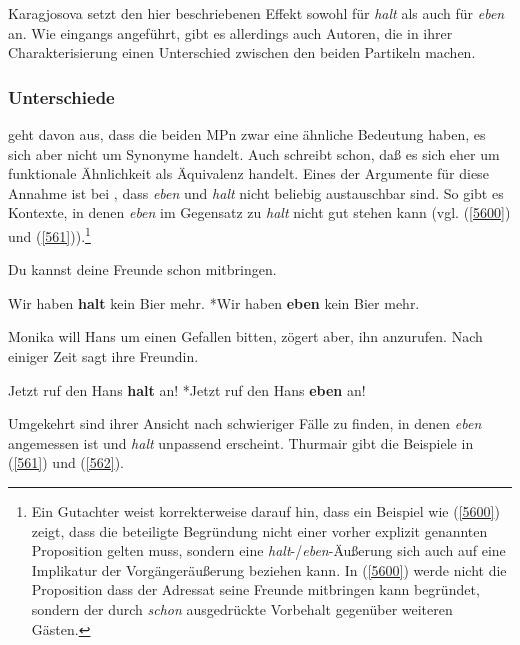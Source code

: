 Karagjosova setzt den hier beschriebenen Effekt sowohl für \textit{halt} als auch für \textit{eben} an. Wie eingangs angeführt, gibt es allerdings auch Autoren, die in ihrer Charakterisierung einen Unterschied zwischen den beiden Partikeln machen.

\subsubsection{Unterschiede}
\label{sec:untersch}
\citet[124]{Thurmair1989} geht davon aus, dass die beiden MPn zwar eine ähnliche Bedeutung haben, es sich aber nicht um Synonyme handelt. Auch \citet[254]{Dahl1988} schreibt schon, \glqq daß es sich eher um funktionale Ähnlichkeit als Äquivalenz\grqq{}  handelt. Eines der Argumente für diese Annahme ist bei \citet{Thurmair1989}, dass \textit{eben} und \textit{halt} nicht beliebig austauschbar sind. So gibt es Kontexte, in denen \textit{eben} im Gegensatz zu \textit{halt} nicht gut stehen kann (vgl. (\ref{5600}) und (\ref{561})).\footnote{Ein Gutachter weist korrekterweise darauf hin, dass ein Beispiel wie (\ref{5600}) zeigt, dass die beteiligte Begründung nicht einer vorher explizit genannten Proposition gelten muss, sondern eine \textit{halt}-/\textit{eben}-Äußerung sich auch auf eine Implikatur der Vorgängeräußerung beziehen kann. In (\ref{5600}) werde nicht die Proposition dass der Adressat seine Freunde mitbringen kann begründet, sondern der durch \textit{schon} ausgedrückte Vorbehalt gegenüber weiteren Gästen.}

\begin{exe}
	\ex\label{5600} Du kannst deine Freunde schon mitbringen.
		\begin{xlist}	
			\ex\label{560a} Wir haben \textbf{halt} kein Bier mehr.
			\ex\label{560b} *Wir haben \textbf{eben} kein Bier mehr.
		\end{xlist}
\end{exe}

\begin{exe}
	\ex\label{560} Monika will Hans um einen Gefallen bitten, zögert aber, ihn anzurufen. Nach einiger Zeit sagt ihre Freundin.
		\begin{xlist}	
			\ex\label{560a} Jetzt ruf den Hans \textbf{halt} an!
			\ex\label{560b} *Jetzt ruf den Hans \textbf{eben} an!
			\hfill\hbox {\citet[124]{Thurmair1989}}
		\end{xlist}
\end{exe}
Umgekehrt sind ihrer Ansicht nach schwieriger Fälle zu finden, in denen \textit{eben} angemessen ist und \textit{halt} unpassend erscheint. Thurmair gibt die Beispiele in (\ref{561}) und (\ref{562}).

